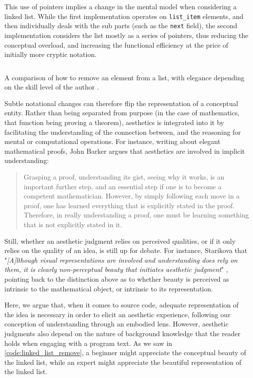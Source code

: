This use of pointers implies a change in the mental model when considering a linked list. While the first implementation operates on \lstinline{list_item} elements, and then individually deals with the sub parts (such as the \lstinline{next} field), the second implementation considers the list mostly as a series of pointers, thus reducing the conceptual overload, and increasing the functional efficiency at the price of initially more cryptic notation.

\begin{listing}
    \inputminted{c}{./corpus/linked_list.c}
    \caption{A comparison of how to remove an element from a list, with elegance depending on the skill level of the author \citep{kirchner_linked_2022a}.}
    \label{code:linked_list_remove}
\end{listing}

Subtle notational changes can therefore flip the representation of a conceptual entity. Rather than being separated from purpose (in the case of mathematics, that function being proving a theorem), aesthetics is integrated into it by facilitating the understanding of the connection between, and the reasoning for mental or computational operations. For instance, writing about elegant mathematical proofs, John Barker argues that aesthetics are involved in implicit understanding:

\begin{quote}
    Grasping a proof, understanding its gist, seeing why it works, is an important further step, and an essential step if one is to become a competent mathematician. However, by simply following each move in a proof, one has learned everything that is explicitly stated in the proof. Therefore, in really understanding a proof, one must be learning something that is not explicitly stated in it. \citep{barker_mathematical_2009}
\end{quote}

Still, whether an aesthetic judgment relies on perceived qualities, or if it only relies on the quality of an idea, is still up for debate. For instance, Starikova that "\emph{[A]lthough visual representations are involved and understanding does rely on them, it is clearly non-perceptual beauty that initiates aesthetic judgment}" \citep{starikova_aesthetic_2018}, pointing back to the distinction above as to whether beauty is perceived as intrinsic to the mathematical object, or intrinsic to its representation.

Here, we argue that, when it comes to source code, adequate representation of the idea is necessary in order to elicit an aesthetic experience, following our conception of understanding through an embodied lens. However, aesthetic judgments also depend on the nature of background knowledge that the reader holds when engaging with a program text. As we saw in \ref{code:linked_list_remove}, a beginner might appreciate the conceptual beauty of the linked list, while an expert might appreciate the beautiful representation of the linked list.

